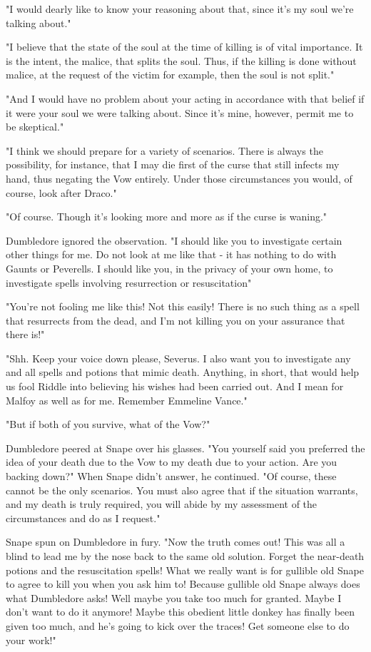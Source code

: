 "I would dearly like to know your reasoning about that, since it's my soul we're talking about."

"I believe that the state of the soul at the time of killing is of vital importance. It is the intent, the malice, that splits the soul. Thus, if the killing is done without malice, at the request of the victim for example, then the soul is not split."

"And I would have no problem about your acting in accordance with that belief if it were your soul we were talking about. Since it's mine, however, permit me to be skeptical."

"I think we should prepare for a variety of scenarios. There is always the possibility, for instance, that I may die first of the curse that still infects my hand, thus negating the Vow entirely. Under those circumstances you would, of course, look after Draco."

"Of course. Though it's looking more and more as if the curse is waning."

Dumbledore ignored the observation. "I should like you to investigate certain other things for me. Do not look at me like that - it has nothing to do with Gaunts or Peverells. I should like you, in the privacy of your own home, to investigate spells involving resurrection or resuscitation{\el}"

"You're not fooling me like this! Not this easily! There is no such thing as a spell that resurrects from the dead, and I'm not killing you on your assurance that there is!"

"Shh. Keep your voice down please, Severus. I also want you to investigate any and all spells and potions that mimic death. Anything, in short, that would help us fool Riddle into believing his wishes had been carried out. And I mean for Malfoy as well as for me. Remember Emmeline Vance."

"But if both of you survive, what of the Vow?"

Dumbledore peered at Snape over his glasses. "You yourself said you preferred the idea of your death due to the Vow to my death due to your action. Are you backing down?" When Snape didn't answer, he continued. "Of course, these cannot be the only scenarios. You must also agree that if the situation warrants, and my death is truly required, you will abide by my assessment of the circumstances and do as I request."

Snape spun on Dumbledore in fury. "Now the truth comes out! This was all a blind to lead me by the nose back to the same old solution. Forget the near-death potions and the resuscitation spells! What we really want is for gullible old Snape to agree to kill you when you ask him to! Because gullible old Snape always does what Dumbledore asks! Well maybe you take too much for granted. Maybe I don't want to do it anymore! Maybe this obedient little donkey has finally been given too much, and he's going to kick over the traces! Get someone else to do your work!"

